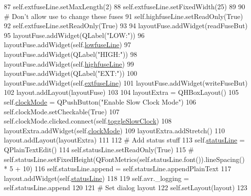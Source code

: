 \begin{DoxyCode}
87         self.extfuseLine.setMaxLength(2)
88         self.extfuseLine.setFixedWidth(25)
89 
90         \textcolor{comment}{# Don't allow use to change these fuses}
91         self.highfuseLine.setReadOnly(\textcolor{keyword}{True})
92         self.extfuseLine.setReadOnly(\textcolor{keyword}{True})
93 
94         layoutFuse.addWidget(readFuseBut)
95         layoutFuse.addWidget(QLabel(\textcolor{stringliteral}{"LOW:"}))
96         layoutFuse.addWidget(self.\hyperlink{classsoftware_1_1chipwhisperer_1_1capture_1_1utils_1_1AVRProgrammer_1_1AVRProgrammerDialog_a83ff125ead745344951f8b53b6cc961e}{lowfuseLine})
97         layoutFuse.addWidget(QLabel(\textcolor{stringliteral}{"HIGH:"}))
98         layoutFuse.addWidget(self.\hyperlink{classsoftware_1_1chipwhisperer_1_1capture_1_1utils_1_1AVRProgrammer_1_1AVRProgrammerDialog_ac41e4bb39408a2a7014e7c0c4259c0ea}{highfuseLine})
99         layoutFuse.addWidget(QLabel(\textcolor{stringliteral}{"EXT:"}))
100         layoutFuse.addWidget(self.\hyperlink{classsoftware_1_1chipwhisperer_1_1capture_1_1utils_1_1AVRProgrammer_1_1AVRProgrammerDialog_a090c304a7af544fc88197fa550f2f09a}{extfuseLine})
101         layoutFuse.addWidget(writeFuseBut)
102         layout.addLayout(layoutFuse)
103 
104         layoutExtra = QHBoxLayout()
105         self.\hyperlink{classsoftware_1_1chipwhisperer_1_1capture_1_1utils_1_1AVRProgrammer_1_1AVRProgrammerDialog_a3db29689f1b93bd92e375003151c3baa}{clockMode} = QPushButton(\textcolor{stringliteral}{"Enable Slow Clock Mode"})
106         self.clockMode.setCheckable(\textcolor{keyword}{True})
107         self.clockMode.clicked.connect(self.\hyperlink{classsoftware_1_1chipwhisperer_1_1capture_1_1utils_1_1AVRProgrammer_1_1AVRProgrammerDialog_a60308672ffe905b679cbdb069c9b62ac}{toggleSlowClock})
108         layoutExtra.addWidget(self.\hyperlink{classsoftware_1_1chipwhisperer_1_1capture_1_1utils_1_1AVRProgrammer_1_1AVRProgrammerDialog_a3db29689f1b93bd92e375003151c3baa}{clockMode})
109         layoutExtra.addStretch()
110         layout.addLayout(layoutExtra)
111 
112         \textcolor{comment}{# Add status stuff}
113         self.\hyperlink{classsoftware_1_1chipwhisperer_1_1capture_1_1utils_1_1AVRProgrammer_1_1AVRProgrammerDialog_af448eaf0fd053a978a868177b0956fe6}{statusLine} = QPlainTextEdit()
114         self.statusLine.setReadOnly(\textcolor{keyword}{True})
115         \textcolor{comment}{# self.statusLine.setFixedHeight(QFontMetrics(self.statusLine.font()).lineSpacing() * 5 + 10)}
116         self.statusLine.append = self.statusLine.appendPlainText
117         layout.addWidget(self.\hyperlink{classsoftware_1_1chipwhisperer_1_1capture_1_1utils_1_1AVRProgrammer_1_1AVRProgrammerDialog_af448eaf0fd053a978a868177b0956fe6}{statusLine})
118 
119         self.avr.\_logging = self.statusLine.append
120 
121         \textcolor{comment}{# Set dialog layout}
122         self.setLayout(layout)
123 
\end{DoxyCode}


